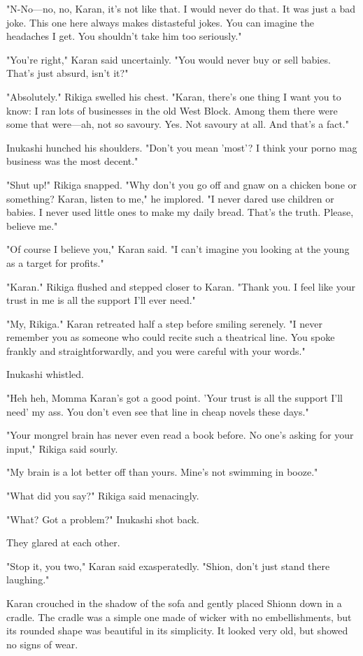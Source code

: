 "N-No---no, no, Karan, it's not like that. I would never do that. It was
just a bad joke. This one here always makes distasteful jokes. You can
imagine the headaches I get. You shouldn't take him too seriously."

"\el You're right," Karan said uncertainly. "You would never buy or sell
babies. That's just absurd, isn't it?"

"Absolutely." Rikiga swelled his chest. "Karan, there's one thing I want
you to know: I ran lots of businesses in the old West Block. Among them
there were some that were---ah, not so savoury. Yes. Not savoury at all.
And that's a fact."

Inukashi hunched his shoulders. "Don't you mean 'most'? I think your
porno mag business was the most decent."

"Shut up!" Rikiga snapped. "Why don't you go off and gnaw on a chicken
bone or something? Karan, listen to me," he implored. "I never dared use
children or babies. I never used little ones to make my daily bread.
That's the truth. Please, believe me."

"Of course I believe you," Karan said. "I can't imagine you looking at
the young as a target for profits."

"Karan." Rikiga flushed and stepped closer to Karan. "Thank you. I feel
like your trust in me is all the support I'll ever need."

"My, Rikiga." Karan retreated half a step before smiling serenely. "I
never remember you as someone who could recite such a theatrical line.
You spoke frankly and straightforwardly, and you were careful with your
words."

Inukashi whistled.

"Heh heh, Momma Karan's got a good point. 'Your trust is all the support
I'll need' my ass. You don't even see that line in cheap novels these
days."

"Your mongrel brain has never even read a book before. No one's asking
for your input," Rikiga said sourly.

"My brain is a lot better off than yours. Mine's not swimming in booze."

"What did you say?" Rikiga said menacingly.

"What? Got a problem?" Inukashi shot back.

They glared at each other.

"Stop it, you two," Karan said exasperatedly. "Shion, don't just stand
there laughing."

Karan crouched in the shadow of the sofa and gently placed Shionn down
in a cradle. The cradle was a simple one made of wicker with no
embellishments, but its rounded shape was beautiful in its simplicity.
It looked very old, but showed no signs of wear.

